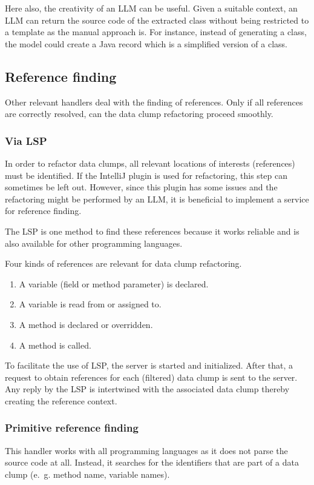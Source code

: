 Here also, the creativity of an \ac{LLM} can be useful. Given a suitable context, an \ac{LLM} can return the source code of the extracted class without being restricted to a template as the manual approach is. For instance, instead of generating a class, the model could create a Java record which is a simplified version of a class. 

\subsection{Reference finding}

Other relevant handlers deal with the finding of references. Only if all references are correctly resolved, can the data clump refactoring proceed smoothly. 

\subsubsection{Via \ac{LSP}}
In order to refactor data clumps, all relevant locations of interests (references) must be identified. If the IntelliJ plugin is used for refactoring, this step can sometimes be left out. However, since this plugin has some issues and the refactoring might be performed by an \ac{LLM}, it is beneficial to implement a service for reference finding. 

The \ac{LSP} is one method to find these references because it works reliable and is also available for other programming languages.

Four kinds of references are relevant for data clump refactoring.

\begin{enumerate}
     \item A  variable (field or method parameter)  is declared.
    \item A variable is read from or assigned to.
   
    \item A method is declared or overridden.
    \item A method is called.
\end{enumerate}
To facilitate the use of \ac{LSP}, the server is started and initialized. After that, a request to obtain references for each (filtered) data clump is sent to the server.
Any reply by the \ac{LSP} is intertwined with the associated data clump thereby creating the reference context.

 
\subsubsection{Primitive reference finding}
This handler works with all programming languages as it does not parse the source code at all. Instead, it searches for the identifiers that are part of a data clump (e.~g. method name, variable names). 

